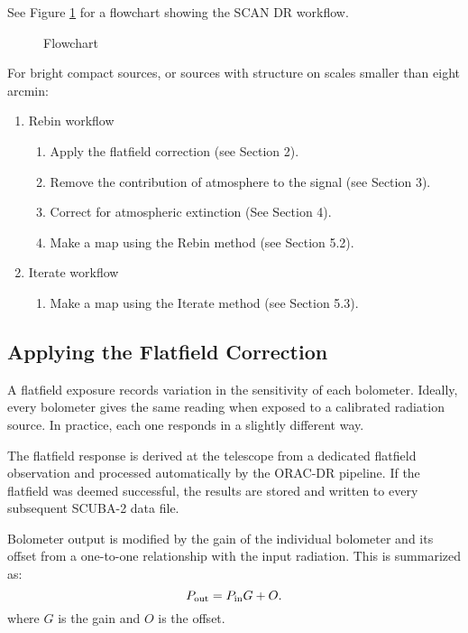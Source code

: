 \documentclass[twoside,11pt]{article}
\renewcommand{\_}{\texttt{\symbol{95}}}
\begin{document}
See Figure \ref{flow} for a flowchart showing the SCAN DR workflow.

\begin{figure}
\caption{Flowchart\label{flow}}
\end{figure}

For bright compact sources, or sources with structure on scales
smaller than eight arcmin:
\begin{enumerate}
\item Rebin workflow
  \begin{enumerate}
  \item Apply the flatfield correction (see Section 2).
  \item Remove the contribution of atmosphere to the signal (see Section 3).
  \item Correct for atmospheric extinction (See Section 4).
  \item Make a map using the Rebin method (see Section 5.2).
  \end{enumerate}

\item Iterate workflow
  \begin{enumerate}
  \item Make a map using the Iterate method (see Section 5.3).
  \end{enumerate}
\end{enumerate}

\subsection{Applying the Flatfield Correction}

A flatfield exposure records variation in the sensitivity of each
bolometer. Ideally, every bolometer gives the same reading when
exposed to a calibrated radiation source. In practice, each one
responds in a slightly different way.

The flatfield response is derived at the telescope from a dedicated
flatfield observation and processed automatically by the ORAC-DR
pipeline. If the flatfield was deemed successful, the results are
stored and written to every subsequent SCUBA-2 data file.

Bolometer output is modified by the gain of the individual bolometer
and its offset from a one-to-one relationship with the input
radiation. This is summarized as:
\begin{equation}
P_{\rm out} = P_{\rm in} G + O.
\end{equation}
where $G$ is the gain and $O$ is the offset.
\end{document}
